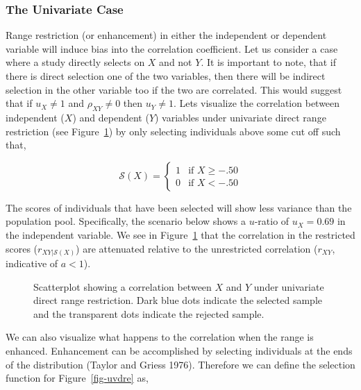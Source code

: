 \documentclass[
  letterpaper,
  DIV=11,
  numbers=noendperiod]{scrreprt}
\begin{document}
\subsubsection*{The Univariate Case}\label{the-univariate-case-1}

Range restriction (or enhancement) in either the independent or
dependent variable will induce bias into the correlation coefficient.
Let us consider a case where a study directly selects on \(X\) and not
\(Y\). It is important to note, that if there is direct selection one of
the two variables, then there will be indirect selection in the other
variable too if the two are correlated. This would suggest that if
\(u_X\neq 1\) and \(\rho_{XY}\neq 0\) then \(u_Y\neq 1\). Lets visualize
the correlation between independent (\(X\)) and dependent (\(Y\))
variables under univariate direct range restriction (see
Figure~\ref{fig-uvdrr}) by only selecting individuals above some cut off
such that,

\[
\mathcal{S}(X) = \begin{cases}1 & \text{if }X\geq-.50\\ 0 & \text{if }X<-.50  \end{cases}
\]

The scores of individuals that have been selected will show less
variance than the population pool. Specifically, the scenario below
shows a \(u\)-ratio of \(u_X=0.69\) in the independent variable. We see
in Figure~\ref{fig-uvdrr} that the correlation in the restricted scores
(\(r_{XY|\mathcal{S}(X)}\)) are attenuated relative to the unrestricted
correlation (\(r_{XY}\), indicative of \(a<1\)).

\begin{figure}[H]


\caption{\label{fig-uvdrr}Scatterplot showing a correlation between
\(X\) and \(Y\) under univariate direct range restriction. Dark blue
dots indicate the selected sample and the transparent dots indicate the
rejected sample.}

\end{figure}%

We can also visualize what happens to the correlation when the range is
enhanced. Enhancement can be accomplished by selecting individuals at
the ends of the distribution (Taylor and Griess 1976). Therefore we can
define the selection function for Figure~\ref{fig-uvdre} as,
\end{document}
